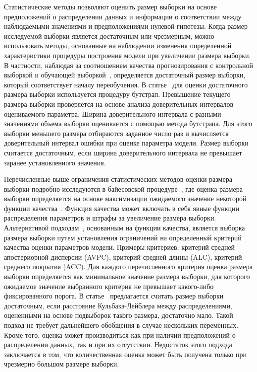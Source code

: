 Статистические методы позволяют оценить размер выборки на основе предположений о распределении данных и информации о соответствии между наблюдаемыми значениями и предположениями нулевой гипотезы. Когда размер исследуемой выборки является достаточным или чрезмерным, можно использовать методы, основанные на наблюдении изменения определенной характеристики процедуры построения модели при увеличении размера выборки. В частности, наблюдая за соотношением качества прогнозирования с контрольной выборкой и обучающей выборкой~\cite{motrenko2014}, определяется достаточный размер выборки, который соответствует началу переобучения. В статье~\cite{qumsiyeh2013} для оценки достаточного размера выборки используется процедуру бутстрап. Превышение текущего размера выборки проверяется на основе анализа доверительных интервалов оцениваемого параметра. Ширина доверительного интервала с разными значениями объема выборки оценивается с помощью метода бутстрапа. Для этого выборки меньшего размера отбираются заданное число раз и вычисляется доверительный интервал ошибки при оценке параметра модели. Размер выборки считается достаточным, если ширина доверительного интервала не превышает заранее установленного значения.

Перечисленные выше ограничения статистических методов оценки размера выборки подробно исследуются в байесовской процедуре~\cite{lindley1997,rubin1998,wang2002}, где оценка размера выборки определяется на основе максимизации ожидаемого значение некоторой функции качества~\cite{lindley1997}. Функция качества может включать в себя явные функции распределения параметров и штрафы за увеличение размера выборки. Альтернативой подходам~\cite{wang2002}, основанным на функции качества, является выборка размера выборки путем установления ограничений на определенный критерий качества оценки параметров модели. Примеры критериев: критерий средней апостериорной дисперсии (AVPC), критерий средней длины (ALC), критерий среднего покрытия (ACC). Для каждого перечисленного критерия оценка размера выборки определяется как минимальное значение размера выборки, для которого ожидаемое значение выбранного критерия не превышает какого-либо фиксированного порога. В статье~\cite{motrenko2014} предлагается считать размер выборки достаточным, если расстояние Кульбака-Лейблера между распределениями, оцененными на основе подвыборок такого размера, достаточно мало. Такой подход не требует дальнейшего обобщения в случае нескольких переменных. Кроме того, оценка может производиться как при наличии предположений о распределении данных, так и при их отсутствии. Недостаток этого подхода заключается в том, что количественная оценка может быть получена только при чрезмерно большом размере выборки.

